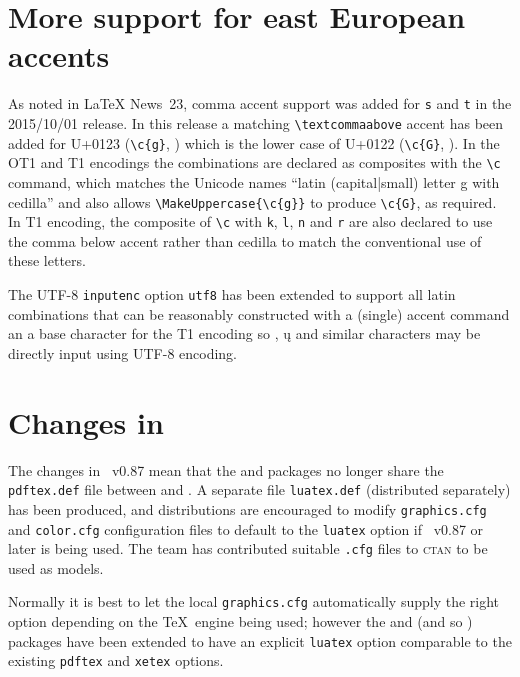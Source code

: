 \documentclass{ltnews}
\begin{document}
\section{More support for east European accents}

As noted in \LaTeX{} News~23, comma accent support was added for \texttt{s} and
\texttt{t} in the 2015/10/01 release. In this release a matching
\verb|\textcommaabove| accent has been added for U+0123 (\verb|\c{g}|,
) which is the lower case of U+0122 (\verb|\c{G}|,
).  In the OT1 and T1 encodings the combinations are
declared as composites with the \verb|\c| command, which matches the
Unicode names ``\textsf{latin (capital|small) letter g with cedilla}'' and
also allows \verb|\MakeUppercase{\c{g}}| to produce \verb|\c{G}|, as
required.  In T1 encoding, the composite of \verb|\c| with \texttt{k}, \texttt{l},
\texttt{n} and \texttt{r} are also
declared to use the comma below accent rather than cedilla to match the
conventional use of these letters.

The UTF-8 \texttt{inputenc} option \texttt{utf8} has been extended to
support all latin combinations that can be reasonably constructed with a
(single) accent command an a base character for the T1 encoding so
, \k{u} and similar characters may be directly input
using UTF-8 encoding.

\section{Changes in }

The changes in ~v0.87 mean that the  and
 packages no longer share the \texttt{pdftex.def} file
between  and . A separate file
\texttt{luatex.def} (distributed separately) has been produced, and
distributions are encouraged to modify \texttt{graphics.cfg} and
\texttt{color.cfg} configuration files to default to the \texttt{luatex}
option if ~v0.87 or later is being used. The team has
contributed suitable \texttt{.cfg} files to \textsc{ctan} to be used
as models.

Normally it is best to let the local \texttt{graphics.cfg}
automatically supply the right option depending on the \TeX\ engine
being used; however the  and  (and so
) packages have been extended to have an explicit
\texttt{luatex} option comparable to the existing \texttt{pdftex} and
\texttt{xetex} options.
\end{document}

